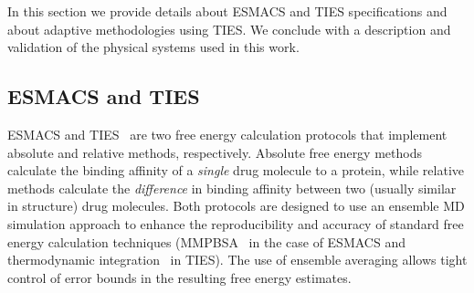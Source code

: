 In this section we provide details about ESMACS and TIES specifications and
about adaptive methodologies using TIES\@. We conclude with a description and
validation of the physical systems used in this work.





\subsection{ESMACS and TIES}\label{ssec:esm_ties}

ESMACS and TIES~\cite{Wan2017brd4, Bhati2017} are two free energy calculation
protocols that implement absolute and relative methods, respectively.
Absolute free energy methods calculate the binding affinity of a
\emph{single} drug molecule to a protein, while relative methods calculate
the \emph{difference} in binding affinity between two (usually similar in
structure) drug molecules. 
Both protocols are designed to use an ensemble MD simulation approach to enhance the reproducibility and accuracy of standard free energy calculation techniques 
(MMPBSA~\cite{Massova1999} in the case of ESMACS and thermodynamic 
integration~\cite{Straatsma1988, Straatsma1991} in TIES).
The use of ensemble averaging allows tight control of error bounds in the 
resulting free energy estimates.

